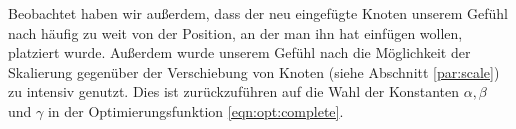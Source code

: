 Beobachtet haben wir außerdem, dass der neu eingefügte Knoten unserem Gefühl nach häufig zu weit von der Position, an der man ihn hat einfügen wollen, platziert wurde. Außerdem wurde unserem Gefühl nach die Möglichkeit der Skalierung gegenüber der Verschiebung von Knoten (siehe Abschnitt \ref{par:scale}) zu intensiv genutzt. Dies ist zurückzuführen auf die Wahl der Konstanten $\alpha, \beta$ und $\gamma$ in der Optimierungsfunktion \ref{eqn:opt:complete}.

